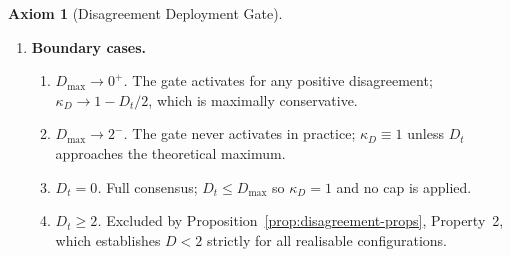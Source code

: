 \documentclass[12pt,openany]{book}
\numberwithin{equation}{chapter}
\theoremstyle{plain}
\theoremstyle{definition}
\newtheorem{axiom}[theorem]{Axiom}
\theoremstyle{remark}
\numberwithin{equation}{chapter}
\theoremstyle{plain}
\begin{document}
\begin{axiom}[Disagreement Deployment Gate]
\begin{enumerate}
\begin{enumerate}
          \item \emph{Monotone decrease.}
                The inner expression
                $1 - (D_t - D_{\max})/(2 - D_{\max})$
                is strictly decreasing in $D_t$ for
                $D_t > D_{\max}$, since
                $(2 - D_{\max}) > 0$ by assumption
                $D_{\max} \in (0,2)$.

          \item \emph{Lower bound.}
                As $D_t \to 2^{-}$,
                \begin{align}
                  1 - \frac{D_t - D_{\max}}{2 - D_{\max}}
                  &\;\to\;
                  1 - \frac{2 - D_{\max}}{2 - D_{\max}}
                  \;=\; 0.
                \end{align}
                The $\max(0,\,\cdot)$ operator ensures
                $\kappa_D \geq 0$ for all $D_t \in [0,2)$.

          \item \emph{Conclusion.}
                Combining the above,
                $\kappa_D \in [0,1]$ for all
                $D_t \in [D_{\max}, 2)$, and
                $\kappa_D = 1$ for $D_t \leq D_{\max}$.
        \end{enumerate}

  \item \textbf{Boundary cases.}
        \begin{enumerate}
          \item \emph{$D_{\max} \to 0^{+}$.}
                The gate activates for any positive
                disagreement; $\kappa_D \to 1 - D_t/2$,
                which is maximally conservative.

          \item \emph{$D_{\max} \to 2^{-}$.}
                The gate never activates in practice;
                $\kappa_D \equiv 1$ unless $D_t$ approaches
                the theoretical maximum.

          \item \emph{$D_t = 0$.}
                Full consensus; $D_t \leq D_{\max}$ so
                $\kappa_D = 1$ and no cap is applied.

          \item \emph{$D_t \geq 2$.}
                Excluded by
                Proposition~\ref{prop:disagreement-props},
                Property~2, which establishes $D < 2$
                strictly for all realisable configurations.
        \end{enumerate}


\end{enumerate}
\end{axiom}
\end{document}
